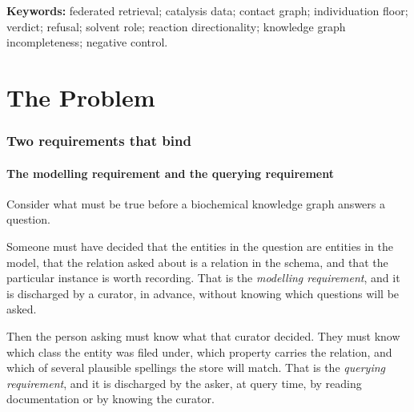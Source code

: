 \documentclass[11pt,twocolumn,a4paper]{article}
\theoremstyle{thmstyle}
\theoremstyle{definition}
\theoremstyle{remark}
\begin{document}
\begin{abstract}
We replicate, on \textbf{3 September 2026}, a divergence between two SPARQL
spellings that the specification defines as one abstract query: against a
public reaction endpoint they return $2$ and $397$, while two independent
local engines agree with each other and with hand computation on a miniature
of the same data shape. We report this as a coverage measurement rather than
as a defect, and state the condition under which that reclassification holds.

Fifty-eight checks are reported across four experiments, of which four are
negative controls that must fail on well-formed input and one is recorded
non-discriminating and excluded from the score. Every quantitative claim is
computed by the accompanying suite or is marked as not established.
\end{abstract}

\noindent\textbf{Keywords:} federated retrieval; catalysis data; contact
graph; individuation floor; verdict; refusal; solvent role; reaction
directionality; knowledge graph incompleteness; negative control.

\tableofcontents

\part{The Problem}

\section{Two requirements that bind}
\label{sec:intro}

\subsection{The modelling requirement and the querying requirement}

Consider what must be true before a biochemical knowledge graph answers a
question.

Someone must have decided that the entities in the question are entities in
the model, that the relation asked about is a relation in the schema, and that
the particular instance is worth recording. That is the \emph{modelling
requirement}, and it is discharged by a curator, in advance, without knowing
which questions will be asked.

Then the person asking must know what that curator decided. They must know
which class the entity was filed under, which property carries the relation,
and which of several plausible spellings the store will match. That is the
\emph{querying requirement}, and it is discharged by the asker, at query time,
by reading documentation or by knowing the curator.
\end{document}
